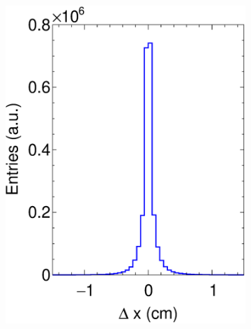 \begin{figure}[t]
     \centering
     \begin{subfigure}[b]{0.32\textwidth}
         \centering
         \includegraphics[width=\textwidth]{figures/ch5-KF_NDGAr/FullSample/Int/Props/ResX.eps}
         \caption{}
         \label{fig:TPCXRes_Int}
     \end{subfigure}
     \begin{subfigure}[b]{0.32\textwidth}
         \centering

\end{subfigure}
\end{figure}
